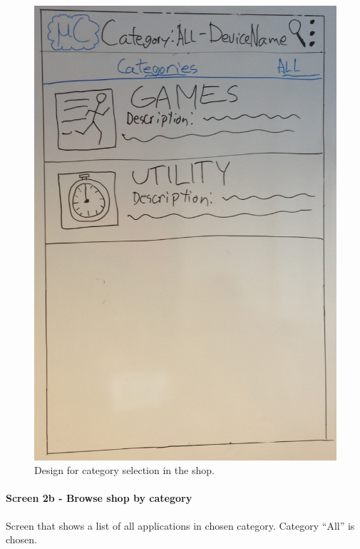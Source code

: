 \begin{figure}[H]
\centering
\includegraphics[scale=0.2]{images/Design_guide/Screen2a.png}
\caption[Screen 2a - Browse shop]{Design for category selection in the shop.}
\label{fig:screen2a}
\end{figure}


\paragraph{Screen 2b - Browse shop by category}
Screen that shows a list of all applications in chosen category. Category ``All'' is chosen.


